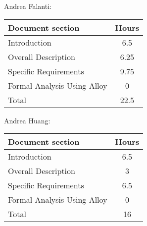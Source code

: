 Andrea Falanti:

\begin{tabular}{|l|c|}
    \hline
    Document section & Hours \\
    \hline
     Introduction & 6.5\\
     Overall Description & 6.25\\
     Specific Requirements & 9.75\\
     Formal Analysis Using Alloy & 0\\
     \hline
     Total & 22.5\\
     \hline
\end{tabular}
\vskip 0.3in

Andrea Huang:

\begin{tabular}{|l|c|}
    \hline
    Document section & Hours \\
    \hline
     Introduction &  6.5\\
     Overall Description & 3\\
     Specific Requirements & 6.5\\
     Formal Analysis Using Alloy & 0\\
     \hline
     Total & 16\\
     \hline
\end{tabular}